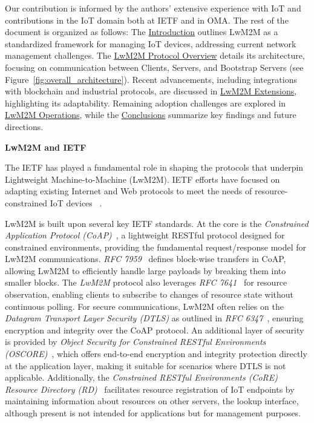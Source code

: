 \documentclass[11pt,sigconf]{iabart}
\begin{document}
Our contribution is informed by the authors' extensive experience with IoT and contributions in the IoT domain both at IETF and in OMA. The rest of the document is organized as follows: The \hyperref[introduction]{Introduction} outlines LwM2M as a standardized framework for managing IoT devices, addressing current network management challenges. The \hyperref[overview]{LwM2M Protocol Overview} details its architecture, focusing on communication between Clients, Servers, and Bootstrap Servers (see Figure~\ref{fig:overall_architecture}). Recent advancements, including integrations with blockchain and industrial protocols, are discussed in \hyperref[extensions]{LwM2M Extensions}, highlighting its adaptability. Remaining adoption challenges are explored in \hyperref[operations]{LwM2M Operations}, while the \hyperref[conclusions]{Conclusions} summarize key findings and future directions.

\textbf{LwM2M and IETF}

The IETF has played a fundamental role in shaping the protocols that underpin Lightweight Machine-to-Machine (LwM2M). IETF efforts have focused on adapting existing Internet and Web protocols to meet the needs of resource-constrained IoT devices ~\cite{9139045}.

LwM2M is built upon several key IETF standards. At the core is the \textit{Constrained Application Protocol (CoAP)}~\cite{rfc7252}, a lightweight RESTful protocol designed for constrained environments, providing the fundamental request/response model for LwM2M communications. \textit{RFC 7959}~\cite{rfc7959} defines block-wise transfers in CoAP, allowing LwM2M to efficiently handle large payloads by breaking them into smaller blocks. The \textit{LwM2M} protocol also leverages \textit{RFC 7641}~\cite{rfc7641} for resource observation, enabling clients to subscribe to changes of resource state without continuous polling. For secure communications, LwM2M often relies on the \textit{Datagram Transport Layer Security (DTLS)} as outlined in \textit{RFC 6347}~\cite{rfc6347}, ensuring encryption and integrity over the CoAP protocol. An additional layer of security is provided by \textit{Object Security for Constrained RESTful Environments (OSCORE)}~\cite{rfc8613}, which offers end-to-end encryption and integrity protection directly at the application layer, making it suitable for scenarios where DTLS is not applicable. Additionally, the \textit{Constrained RESTful Environments (CoRE) Resource Directory (RD)}~\cite{rfc9176} facilitates resource registration of IoT endpoints by maintaining information about resources on other servers, the lookup interface, although present is not intended for applications but for management purposes.
\sloppy
\end{document}
